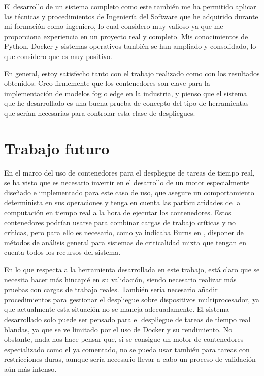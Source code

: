 El desarrollo de un sistema completo como este también me ha permitido
aplicar las técnicas y procedimientos de Ingeniería del Software que he
adquirido durante mi formación como ingeniero, lo cual considero muy valioso ya
que me proporciona experiencia en un proyecto real y completo. Mis conocimientos
de Python, Docker y sistemas operativos también se han ampliado y consolidado,
lo que considero que es muy positivo.

En general, estoy satisfecho tanto con el trabajo realizado como con los
resultados obtenidos. Creo firmemente que los contenedores son clave para la
implementación de modelos fog o edge en la industria, y pienso que el sistema
que he desarrollado es una buena prueba de concepto del tipo de herramientas que
serían necesarias para controlar esta clase de despliegues.

\section{Trabajo futuro}

En el marco del uso de contenedores para el despliegue de tareas de tiempo real,
se ha visto que es necesario invertir en el desarrollo de un motor especialmente
diseñado e implementado para este caso de uso, que asegure un comportamiento
determinista en sus operaciones y tenga en cuenta las particularidades de la
computación en tiempo real a la hora de ejecutar los contenedores. Estos
contenedores podrían usarse para combinar cargas de trabajo críticas y no
críticas, pero para ello es necesario, como ya indicaba Burns en
\cite{burns_mixed_2015}, disponer de métodos de análisis general para sistemas
de criticalidad mixta que tengan en cuenta todos los recursos del sistema.

En lo que respecta a la herramienta desarrollada en este trabajo, está claro que
se necesita hacer más hincapié en su validación, siendo necesario realizar más
pruebas con cargas de trabajo reales. También sería necesario añadir
procedimientos para gestionar el despliegue sobre dispositivos multiprocesador,
ya que actualmente esta situación no se maneja adecuadamente. El sistema
desarrollado solo puede ser pensado para el despliegue de tareas de tiempo real
blandas, ya que se ve limitado por el uso de Docker y su rendimiento. No
obstante, nada nos hace pensar que, si se consigue un motor de contenedores
especializado como el ya comentado, no se pueda usar también para tareas con
restricciones duras, aunque sería necesario llevar a cabo un proceso de
validación aún más intenso.

